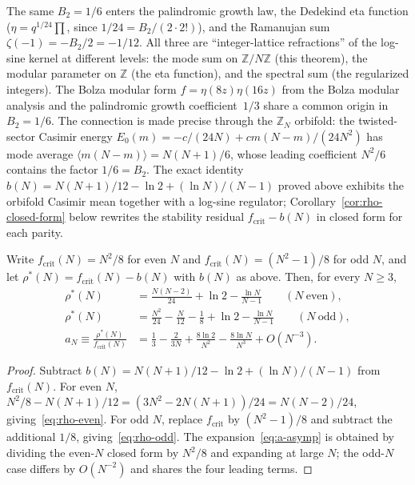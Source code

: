 \begin{remark}
\label{rmk:bernoulli-dedekind}
The same $B_2 = 1/6$ enters the palindromic growth law,
the Dedekind eta function
($\eta = q^{1/24}\prod$, since $1/24 = B_2/(2\cdot 2!)$),
and the Ramanujan sum
$\zeta(-1) = -B_2/2 = -1/12$.
All three are ``integer-lattice refractions'' of the log-sine
kernel at different levels:
the mode sum on $\mathbb{Z}/N\mathbb{Z}$ (this theorem),
the modular parameter on $\mathbb{Z}$ (the eta function), and the
spectral sum (the regularized integers).
The Bolza modular form $f = \eta(8z)\eta(16z)$ from
the Bolza modular analysis and the palindromic growth
coefficient~$1/3$ share a common origin in $B_2 = 1/6$.
The connection is made precise through the $\mathbb{Z}_N$ orbifold:
the twisted-sector Casimir energy $E_0(m) = -c/(24N) + cm(N{-}m)/(24N^2)$
has mode average $\langle m(N{-}m)\rangle = N(N{+}1)/6$, whose leading
coefficient $N^2/6$ contains the factor $1/6 = B_2$.
The exact identity $b(N) = N(N{+}1)/12 - \ln 2 + (\ln N)/(N{-}1)$
proved above exhibits the orbifold Casimir mean together with
a log-sine regulator; Corollary~\ref{cor:rho-closed-form} below
rewrites the stability residual $f_{\mathrm{crit}} - b(N)$ in
closed form for each parity.
\end{remark}

\begin{corollary}
\label{cor:rho-closed-form}
Write $f_{\mathrm{crit}}(N) = N^2/8$ for even $N$ and
$f_{\mathrm{crit}}(N) = (N^2{-}1)/8$ for odd $N$, and let
$\rho^*(N) = f_{\mathrm{crit}}(N) - b(N)$
with $b(N)$ as above. Then, for every $N \ge 3$,
\begin{align}
  \rho^*(N) &= \frac{N(N-2)}{24} + \ln 2
    - \frac{\ln N}{N-1} \qquad (N\ \mathrm{even}),
    \label{eq:rho-even}\\
  \rho^*(N) &= \frac{N^2}{24} - \frac{N}{12} - \frac18
    + \ln 2 - \frac{\ln N}{N-1}
    \qquad (N\ \mathrm{odd}),
    \label{eq:rho-odd}\\
  a_N \equiv \frac{\rho^*(N)}{f_{\mathrm{crit}}(N)} &=
    \frac13 - \frac{2}{3N} + \frac{8\ln 2}{N^2}
    - \frac{8\ln N}{N^3} + O(N^{-3}). \label{eq:a-asymp}
\end{align}
\end{corollary}

\begin{proof}
Subtract $b(N) = N(N{+}1)/12 - \ln 2 + (\ln N)/(N{-}1)$ from
$f_{\mathrm{crit}}(N)$.
For even $N$,
$N^2/8 - N(N{+}1)/12 = (3N^2 - 2N(N{+}1))/24 = N(N{-}2)/24$,
giving~\eqref{eq:rho-even}.
For odd $N$, replace $f_{\mathrm{crit}}$ by $(N^2{-}1)/8$ and
subtract the additional $1/8$, giving~\eqref{eq:rho-odd}.
The expansion~\eqref{eq:a-asymp} is obtained by dividing the
even-$N$ closed form by $N^2/8$ and expanding at large $N$;
the odd-$N$ case differs by $O(N^{-2})$ and shares the four
leading terms.
\end{proof}

